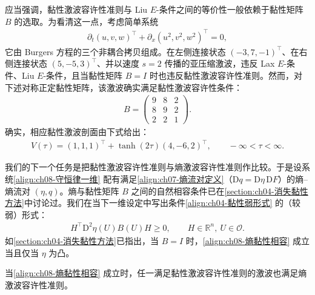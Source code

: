 \documentclass[../../main.tex]{subfiles}
\begin{document}
应当强调，黏性激波容许性准则与 Liu $E$-条件之间的等价性一般依赖于黏性矩阵 $B$ 的选取。为看清这一点，考虑简单系统
\begin{align}
\partial_t(u,v,w)^\top+\partial_x(u^2,v^2,w^2)^\top=0,
\label{align:ch08-三个burgers}
\end{align}
它由 Burgers 方程的三个非耦合拷贝组成。在左侧连接状态 $(-3,7,-1)^\top$、在右侧连接状态 $(5,-5,3)^\top$、并以速度 $s=2$ 传播的亚压缩激波，违反 Lax $E$-条件、Liu $E$-条件，且当黏性矩阵 $B=I$ 时也违反黏性激波容许性准则。然而，对下述对称正定黏性矩阵，该激波确实满足黏性激波容许性条件：
\begin{align}
B=\begin{pmatrix}9&8&2\\8&9&2\\2&2&1\end{pmatrix}.
\label{align:ch08-非恒等黏性}
\end{align}
确实，相应黏性激波剖面由下式给出：
\begin{align}
V(\tau)=(1,1,1)^\top+\tanh(2\tau)(4,-6,2)^\top,\qquad-\infty<\tau<\infty.
\label{align:ch08-非恒等剖面}
\end{align}

我们的下一个任务是把黏性激波容许性准则与熵激波容许性准则作比较。于是设系统\eqref{align:ch08-守恒律一维} 配有满足\eqref{align:ch07-熵流对定义}（$\mathrm{D}q=\mathrm{D}\eta\,\mathrm{D}F$）的熵--熵流对 $(\eta,q)$。熵与黏性矩阵 $B$ 之间的自然相容条件已在\cref{section:ch04-消失黏性方法}中讨论过。我们在当下一维设定中写出条件\eqref{align:ch04-黏性弱形式} 的（较弱）形式：
\begin{align}
H^\top\mathrm{D}^2\eta(U)B(U)H\geqslant0,\qquad H\in\mathbb R^n,\ U\in\mathcal O.
\label{align:ch08-熵黏性相容}
\end{align}
如\cref{section:ch04-消失黏性方法}已指出，当 $B=I$ 时，\eqref{align:ch08-熵黏性相容} 成立当且仅当 $\eta$ 为凸。

\begin{theorem}[黏性准则蕴涵熵准则]\label{theorem:ch08-黏性蕴涵熵}
当\eqref{align:ch08-熵黏性相容} 成立时，任一满足黏性激波容许性准则的激波也满足熵激波容许性准则。
\end{theorem}
\end{document}
